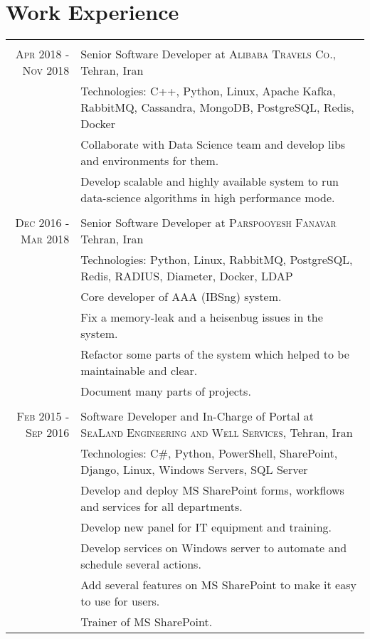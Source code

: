 \documentclass[a4paper,11pt]{article}
\begin{document}
\section{Work Experience}
\begin{tabular}{r|p{11cm}}

    \multicolumn{2}{c}{}\\
    \textsc{Apr 2018 - Nov 2018}
    & Senior Software Developer at \textsc{Alibaba Travels Co.},
    Tehran, Iran\\
    &\footnotesize{Technologies: C++, Python, Linux, Apache Kafka, RabbitMQ, Cassandra, MongoDB, PostgreSQL, Redis, Docker}\\
    &\footnotesize{Collaborate with Data Science team and develop libs and environments for them.}\\
    &\footnotesize{Develop scalable and highly available system to run data-science algorithms in high performance mode.}\\

    \multicolumn{2}{c}{}\\
    \textsc{Dec 2016 - Mar 2018}
    & Senior Software Developer at \textsc{Parspooyesh Fanavar}
    Tehran, Iran\\
    &\footnotesize{Technologies: Python, Linux, RabbitMQ, PostgreSQL, Redis, RADIUS, Diameter, Docker, LDAP}\\
    &\footnotesize{Core developer of AAA (IBSng) system.}\\
    &\footnotesize{Fix a memory-leak and a heisenbug issues in the system.}\\
    &\footnotesize{Refactor some parts of the system which helped to be maintainable and clear.}\\
    &\footnotesize{Document many parts of projects.}\\

    \multicolumn{2}{c}{}\\
    \textsc{Feb 2015 - Sep 2016}
    & Software Developer and In-Charge of Portal at \textsc{SeaLand Engineering and Well Services},
    Tehran, Iran\\
    &\footnotesize{Technologies: C\#, Python, PowerShell, SharePoint, Django, Linux,  Windows Servers, SQL Server}\\
    &\footnotesize{Develop and deploy MS SharePoint forms, workflows and services for all departments.}\\
    &\footnotesize{Develop new panel for IT equipment and training.}\\
    &\footnotesize{Develop services on Windows server to automate and schedule several actions.}\\
    &\footnotesize{Add several features on MS SharePoint to make it easy to use for users.}\\
    &\footnotesize{Trainer of MS SharePoint.}\\


\end{tabular}
\end{document}
